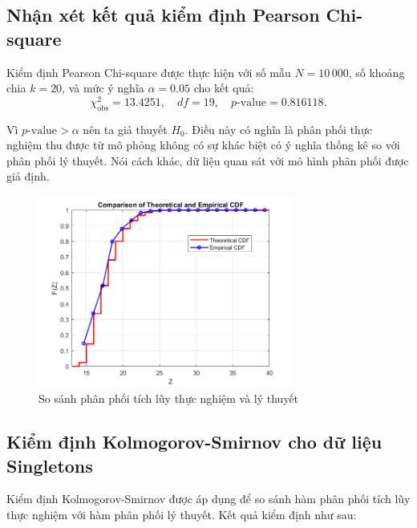\subsection*{Nhận xét kết quả kiểm định Pearson Chi-square}

Kiểm định Pearson Chi-square được thực hiện với số mẫu $N = 10\,000$, số khoảng chia $k = 20$, và mức ý nghĩa $\alpha = 0.05$ cho kết quả:
\[
\chi^2_{\text{obs}} = 13.4251, \quad df = 19, \quad p\text{-value} = 0.816118.
\]

Vì $p\text{-value} > \alpha$ nên ta  giả thuyết $H_0$. Điều này có nghĩa là phân phối thực nghiệm thu được từ mô phỏng không có sự khác biệt có ý nghĩa thống kê so với phân phối lý thuyết. Nói cách khác, dữ liệu quan sát  với mô hình phân phối được giả định.

\begin{figure}[h!]
    \centering
    \includegraphics[width=0.75\textwidth]{../../assets/images/Singletons_Pearson.png}
    \caption{So sánh phân phối tích lũy thực nghiệm và lý thuyết}
    \label{fig:Sing_comparison}
\end{figure}

\subsection{Kiểm định Kolmogorov-Smirnov cho dữ liệu Singletons}

Kiểm định Kolmogorov-Smirnov được áp dụng để so sánh hàm phân phối tích lũy thực nghiệm với hàm phân phối lý thuyết. Kết quả kiểm định như sau:

